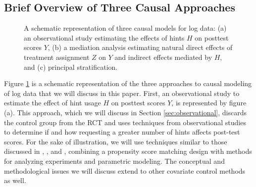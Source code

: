 \documentclass{article}
\begin{document}
\subsection{Brief Overview of Three Causal Approaches}
\begin{figure}
\centering
{}
\caption{A schematic representation of three causal models for
  log data: (a) an observational study estimating the effects of hints
  $H$ on posttest scores $Y$, (b) a mediation analysis estimating
  natural direct effects of treatment assignment $Z$ on $Y$ and
  indirect effects mediated by $H$, and (c) principal stratification.}
\label{mediationFig}
\end{figure}

Figure \ref{mediationFig} is a schematic representation of the three
approaches to causal modeling of log data that we will discuss in this
paper.
First, an observational study to estimate the effect of hint usage $H$
on posttest scores $Y$, is represented by figure (a).
This approach, which we will discuss in Section
\ref{sec:observational}, discards the control group from the RCT and
uses techniques from observational studies to determine if and how requesting
a greater number of hints affects post-test scores.
For the sake of illustration, we will use techniques similar to those
discussed in \citet{rosenbaum2002observational},
 \citet{hansen2009b}, and \citet{ho:etal:2007}, combining a propensity
 score matching design with methods for analyzing experiments and
 parametric modeling.
The conceptual and methodological issues we will discuss extend to
other covariate control methods as well.
\end{document}
